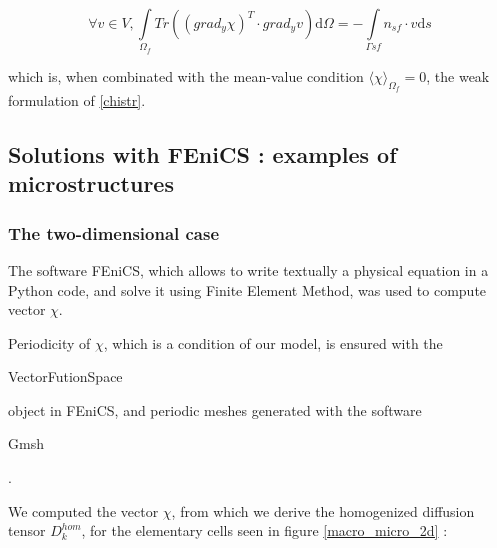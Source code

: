 \begin{equation}\label{chiwper}
\forall v \in V , %
\int\limits_{\Omega_f}Tr\left(\left(grad_y\chi\right)^T\cdot grad_y v\right)\text{d}\Omega=%
-\int\limits_{\Gamma{sf}}n_{sf}\cdot v\text{d}s
\end{equation}

which is, when combinated with the mean-value condition $\langle\chi\rangle_{\Omega_f}=0$, the weak formulation of \ref{chistr}.

\subsection{Solutions with FEniCS : examples of microstructures}

\subsubsection{The two-dimensional case}

The software FEniCS, which allows to write textually a physical equation in a Python code, %
and solve it using Finite Element Method, %
was used to compute vector $\chi$.

\par
Periodicity of $\chi$, which is a condition of our model, is ensured with the \begin{code}VectorFutionSpace\end{code} object in FEniCS, %
and periodic meshes generated with the software \begin{code}Gmsh\end{code}.

\begin{comment}
\begin{itemize}
\item On one hand, for the classical resolution of problem \ref{chiw}, we used FEM and meshes generated with \begin{code}Gmsh\end{code} ;
\item On the other hand, we compile the information obtained with a finite set of solutions \dots
\end{itemize}
\end{comment}

\etoile
We computed the vector $\chi$, from which we derive the homogenized diffusion tensor $D_k^{hom}$, %
for the elementary cells seen in figure \ref{macro_micro_2d} :

